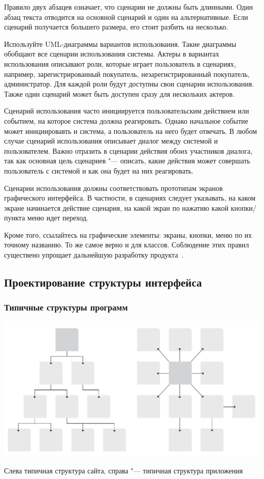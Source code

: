 \documentclass{../industrial-development}
\begin{document}
Правило двух абзацев означает, что сценарии не должны быть длинными. Один абзац текста отводится на основной сценарий и один на альтернативные. Если сценарий получается большего размера, его стоит разбить на несколько.

Используйте UML-диаграммы вариантов использования. Такие диаграммы обобщают все сценарии использования системы. Актеры в вариантах использования описывают роли, которые играет пользователь в сценариях, например, зарегистрированный покупатель, незарегистрированный покупатель, администратор. Для каждой роли будут доступны свои сценарии использования. Также один сценарий может быть доступен сразу для нескольких актеров.

Сценарий использования часто инициируется пользовательским действием или событием, на которое система должна реагировать. Однако начальное событие может инициировавть и система, а пользователь на него будет отвечать. В любом случае сценарий использования описывает диалог между системой и пользователем. Важно отразить в сценарии действия обоих участников диалога, так как основная цель сценариев "--- описать, какие действия может совершать пользователь с системой и как она будет на них реагировать.

Сценарии использования должны соответствовать прототипам экранов графического интерфейса. В частности, в сценариях следует указывать, на каком экране начинается действие сценария, на какой экран по нажатию какой кнопки/пункта меню идет переход.

Кроме того, ссылайтесь на графические элементы: экраны, кнопки, меню по их точному названию. То же самое верно и для классов. Соблюдение этих правил существено упрощает дальнейшую разработку продукта~\cite[107--117]{Rosenberg}.

\subsection{Проектирование структуры интерфейса}

\begin{frame} \frametitle{Типичные структуры программ}
 \includegraphics[width=\textwidth]{structure}
 \begin{block}{}
  Слева типичная структура сайта, справа "--- типичная структура приложения
 \end{block}
\end{frame}
\end{document}
